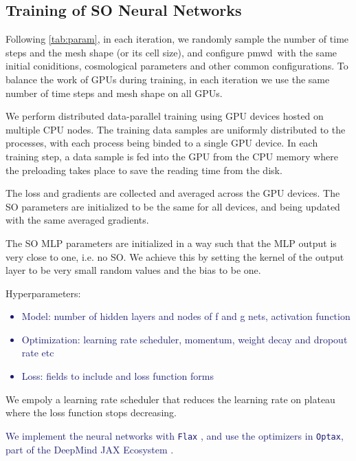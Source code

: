 \documentclass[modern, trackchanges, dvipsnames]{aastex631}
\newcommand{\pmwd}{{\usefont{T1}{nova}{m}{sl}pmwd}}
\newcommand{\YZ}[1]{\textcolor{MidnightBlue}{#1}}
\begin{document}
\vspace{1em}
\subsection{Training of SO Neural Networks}

Following \autoref{tab:param}, in each iteration, we randomly sample the number
of time steps and the mesh shape (or its cell size), and configure \pmwd\ with
the same initial coniditions, cosmological parameters and other common
configurations.
To balance the work of GPUs during training, in each iteration we use
the same number of time steps and mesh shape on all GPUs.

We perform distributed data-parallel training using GPU devices hosted on
multiple CPU nodes.
The training data samples are uniformly distributed to the processes, with
each process being binded to a single GPU device.
In each training step, a data sample is fed into the GPU from the CPU memory
where the preloading takes place to save the reading time from the disk.

The loss and gradients are collected and averaged across the GPU devices.
The SO parameters are initialized to be the same for all devices, and being
updated with the same averaged gradients.

The SO MLP parameters are initialized in a way such that the MLP output is very
close to one, i.e. no SO.
We achieve this by setting the kernel of the output layer to be very small
random values and the bias to be one.

Hyperparameters:
\YZ{
\begin{itemize}
  \item Model: number of hidden layers and nodes of f and g nets, activation function
  \item Optimization: learning rate scheduler, momentum, weight decay and dropout rate etc
  \item Loss: fields to include and loss function forms
\end{itemize}
}

We empoly a learning rate scheduler that reduces the learning rate on plateau
where the loss function stops decreasing.


\YZ{
We implement the neural networks with \texttt{Flax} \citep{flax2020github}, and
use the optimizers in \texttt{Optax}, part of the DeepMind JAX Ecosystem
\citep{deepmind2020jax}.
}


\vspace{1em}
\end{document}

